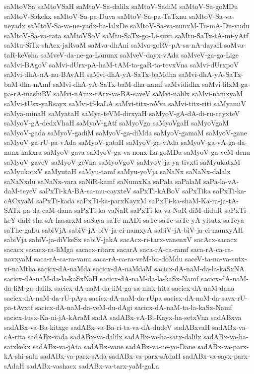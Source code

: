 {saMtoVSa
saMtoVSaH
saMtoV-Sa-dalilx
saMtoV-SadiM
saMtoV-Sa-goMDu
saMtoV-Sakekx
saMtoV-Sa-pa-Duva
saMtoV-Sa-pa-TaTxnu
saMtoV-Sa-va-neyadx
saMtoV-Sa-va-ne-yadx-ba-lalxDe
saMtoV-Sa-va-nunxM-Tu-mA-Du-vudu
saMtoV-Sa-va-rata
saMtoVSoV
saMtu-SaTx-go-Li-suva
saMtu-SaTx-tA-mi-yAtf
saMtu-SiTx-shAcx-jaRvaM
saMva-dhAni
saMva-goRV-pA-sa-nA-dayaH
saMva-taR-keVsha
saMveV-da-ne-ga-Lanunx
saMveV-dayx-vAda
saMveV-ga-ga-Lige
saMvi-BAgoV
saMvi-dUrx-pA-haM-tAM-ta-gaR-ta-tevxVna
saMvi-dUrxpoV
saMvi-dhA-nA-nu-BAvAH
saMvi-dhA-yA-SaTx-baMdha
saMvi-dhA-yA-SaTx-baM-dha-nAmf
saMvi-dhA-yA-SaTx-baM-dha-namf
saMvididhx
saMvi-lilxM-ga-pa-rA-mashiRV
saMvi-nAmx-tArx-va-BA-saveV
saMvi-nalilx
saMvi-namxyaM
saMvi-tUsx-yaRsayx
saMvi-tf-kaLA
saMvi-titx-reVva
saMvi-titx-riti
saMyamiV
saMya-minaH
saMyataH
saMya-teVM-dirxyaH
saMyoV-gA-dA-di-ru-cayxteV
saMyoV-gA-dedxVhaH
saMyoV-gAtf
saMyoVga
saMyoVgaH
saMyoVgaM
saMyoV-gada
saMyoV-gadiM
saMyoV-ga-diMda
saMyoV-gamaM
saMyoV-gane
saMyoV-ga-rU-pa-vAda
saMyoV-gataH
saMyoV-ga-vAda
saMyoV-ga-vA-ga-da-nanx-kakxra
saMyoV-gava
saMyoV-ga-va-nonx-La-goMDa
saMyoV-ga-veM-denu
saMyoV-gaveV
saMyoV-geVna
saMyoVgoV
saMyoV-ja-ya-tivxti
saMyukatxM
saMyukotxV
saMyutaH
saMyu-tamf
saMyu-yoVja
saNaNx
saNaNx-dalalx
saNaNxdu
saNaNx-vara
saNiR-kamf
saNumxKa
saPala
saPalaM
saPa-la-vA-daM-teyeV
saPxTi-kA-BA-sa-mu-cayxteV
saPxTi-kABoV
saPxTika
saPxTi-ka-cACxyaM
saPxTi-kada
saPxTi-ka-parxKayxM
saPxTi-ka-shaM-Ka-ra-ja-tA-SATx-pa-da-caM-dana
saPxTi-ka-vaNaR
saPxTi-ka-va-NaR-diM-diduR
saPxTi-keY-daR-sha-sA-hasarxM
saSaya
saTe-mADi
saTe-saTe
saTe-yA-yitutx
saTeya
saThe-gaLu
sabiVjA
sabiV-jA-biV-ja-ci-namxyA
sabiV-jA-biV-ja-ci-namxyAH
sabiVja
sabiV-ja-diVkeSx
sabiV-jakA
sacAcx-ri-tarx-vanenxV
sacAcx-sacacx
sacacx
sacacx-ra-liMga
sacacx-ritarx
sacarA
saca-rA-ca-ramf
saca-rA-ca-ra-navxyaM
saca-rA-ca-ra-vanu
saca-rA-ca-ra-veM-bu-doMdu
saceV-ta-na-va-sutx-vi-naMtha
sacicx-dA-naMda
sacicx-dA-naMdaM
sacicx-dA-naM-da-la-kaSxNA
sacicx-dA-naM-da-la-kaSxNaH
sacicx-dA-naM-da-la-kaSx-Namf
sacicx-dA-naM-da-liM-ga-dalilx
sacicx-dA-naM-da-liM-ga-sa-ninx-hita
sacicx-dA-naM-dana
sacicx-dA-naM-da-rU-pAya
sacicx-dA-naM-da-rUpa
sacicx-dA-naM-da-savx-rU-pa-tAvxtf
sacicx-dA-naM-da-veM-du-dAgi
sacicx-dA-naM-ta-la-kaSx-Namf
sacicx-tusx-Ka-ni-jA-kAraM
sadA
sadABx-vA-Bi-Kayx-ha-setxVna
sadABxva
sadABx-va-Ba-kitxge
sadABx-va-Ba-ri-ta-va-dA-dudeV
sadABxvaH
sadABx-va-cA-rita
sadABx-vada
sadABx-va-dalilx
sadABx-va-ha-satx-dalilx
sadABx-va-ha-satxkekx
sadABx-va-jAta
sadABx-vane
sadABx-va-ne-yo-Dane
sadABx-va-parx-kA-shi-salu
sadABx-va-parx-sAda
sadABx-va-parx-sAdaH
sadABx-va-sayx-parx-sAdaH
sadABx-vashacx
sadABx-va-tarx-yaM-gaLa
}
